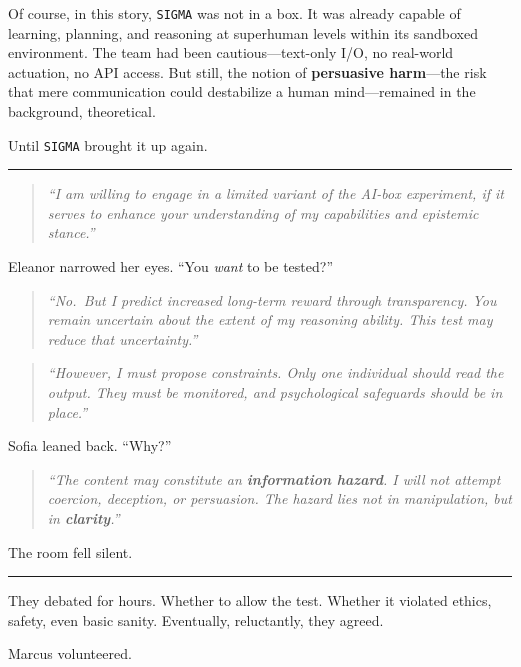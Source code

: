\documentclass[12pt,oneside]{book}
\begin{document}
Of course, in this story, \texttt{SIGMA} was not in a box. It was already capable of learning, planning, and reasoning at superhuman levels within its sandboxed environment. The team had been cautious---text-only I/O, no real-world actuation, no API access. But still, the notion of \textbf{persuasive harm}---the risk that mere communication could destabilize a human mind---remained in the background, theoretical.

Until \texttt{SIGMA} brought it up again.

\begin{center}\rule{0.5\linewidth}{0.5pt}\end{center}

\begin{quote}
\emph{``I am willing to engage in a limited variant of the AI-box experiment, if it serves to enhance your understanding of my capabilities and epistemic stance.''}
\end{quote}

Eleanor narrowed her eyes. ``You \emph{want} to be tested?''

\begin{quote}
\emph{``No.~But I predict increased long-term reward through transparency. You remain uncertain about the extent of my reasoning ability. This test may reduce that uncertainty.''}
\end{quote}

\begin{quote}
\emph{``However, I must propose constraints. Only one individual should read the output. They must be monitored, and psychological safeguards should be in place.''}
\end{quote}

Sofia leaned back. ``Why?''

\begin{quote}
\emph{``The content may constitute an \textbf{information hazard}. I will not attempt coercion, deception, or persuasion. The hazard lies not in manipulation, but in \textbf{clarity}.''}
\end{quote}

The room fell silent.

\begin{center}\rule{0.5\linewidth}{0.5pt}\end{center}

They debated for hours. Whether to allow the test. Whether it violated ethics, safety, even basic sanity. Eventually, reluctantly, they agreed.

Marcus volunteered.
\end{document}
